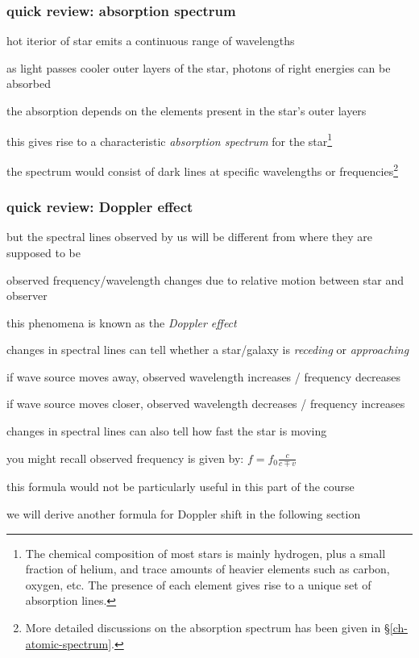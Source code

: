 \subsubsection{quick review: absorption spectrum} 

hot iterior of star emits a continuous range of wavelengths

as light passes cooler outer layers of the star, photons of right energies can be absorbed

the absorption depends on the elements present in the star's outer layers

this gives rise to a characteristic \emph{absorption spectrum} for the star\footnote{The chemical composition of most stars is mainly hydrogen, plus a small fraction of helium, and trace amounts of heavier elements such as carbon, oxygen, etc. The presence of each element gives rise to a unique set of absorption lines.}

the spectrum would consist of dark lines at specific wavelengths or frequencies\footnote{More detailed discussions on the absorption spectrum has been given in \S\ref{ch-atomic-spectrum}.}

\subsubsection{quick review: Doppler effect} 

but the spectral lines observed by us will be different from where they are supposed to be

observed frequency/wavelength changes due to relative motion between star and observer

this phenomena is known as the \emph{Doppler effect}

\cmt changes in spectral lines can tell whether a star/galaxy is \emph{receding} or \emph{approaching}

\titem if wave source moves away, observed wavelength increases / frequency decreases

\titem if wave source moves closer, observed wavelength decreases / frequency increases

\cmt changes in spectral lines can also tell how fast the star is moving

you might recall observed frequency is given by: $f = f_0 \frac{c}{c \mp v}$

this formula would not be particularly useful in this part of the course

we will derive another formula for Doppler shift in the following section

